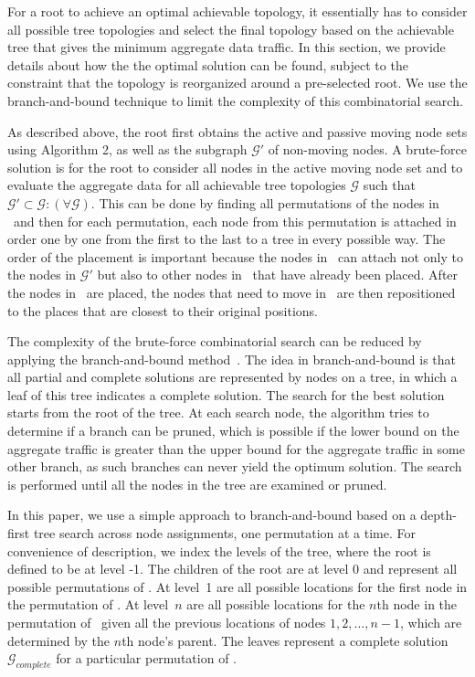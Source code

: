 \documentclass[10pt,conference]{IEEEtran}
\begin{document}
For a root to achieve an optimal achievable topology, it essentially
has to consider all possible tree topologies and select the final
topology based on the achievable tree that gives the minimum aggregate
data traffic.  In this section, we provide details about how the
the optimal solution can be found, subject to the constraint that
the topology is reorganized around a pre-selected root.  We use the
branch-and-bound technique to limit the complexity of this
combinatorial search.

As described above, the root first obtains the active and passive
moving node sets using Algorithm 2, as well as the subgraph
$\mathcal{G}'$ of non-moving nodes.  A brute-force solution is for the
root to consider all nodes in the active moving node set and to
evaluate the aggregate data for all achievable tree topologies
$\mathcal{G}$ such that $ \mathcal{G}' \subset \mathcal{G}
:(\forall{\mathcal{G}})$.  This can be done by finding all
permutations of the nodes in \AM\ and then for each permutation, each
node from this permutation is attached in order one by one from the
first to the last to a tree in every possible way.  The order of the
placement is important because the nodes in \AM\ can attach not only
to the nodes in $\mathcal{G}'$ but also to other nodes in \AM\
that have already been placed.  After the nodes in \AM\ are placed,
the nodes that need to move in \PM\ are then repositioned to the
places that are closest to their original positions.


The complexity of the brute-force combinatorial search can be reduced
by applying the branch-and-bound method~\cite{land60a}.  The idea in
branch-and-bound is that all partial and complete solutions are
represented by nodes on a tree, in which a leaf of this tree indicates
a complete solution.  The search for the best solution starts from the
root of the tree.  At each search node, the algorithm tries to
determine if a branch can be pruned, which is possible if the lower
bound on the aggregate traffic is greater than the upper bound for the
aggregate traffic in some other branch, as such branches can never
yield the optimum solution.  The search is performed until all the
nodes in the tree are examined or pruned.

In this paper, we use a simple approach to branch-and-bound based on a
depth-first tree search across node assignments, one permutation at a
time.  For convenience of description, we index the levels of the
tree, where the root is defined to be at level -1.  The children of
the root are at level 0 and represent all possible permutations of \AM
.  At level~1 are all possible locations for the first node in the
permutation of \AM .  At level~$n$ are all possible locations for the
$n$th node in the permutation of \AM\ given all the previous locations
of nodes $1,2,\ldots,n-1$, which are determined by the $n$th node's
parent.  The leaves represent a complete solution
$\mathcal{G}_{complete}$ for a particular permutation of \AM .
\end{document}
